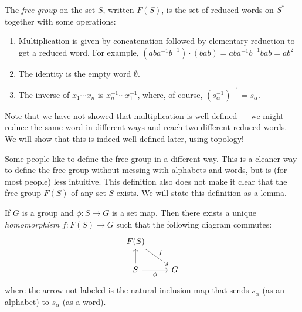 \documentclass[a4paper]{article}
\begin{document}
\begin{defi}
  The \emph{free group} on the set $S$, written $F(S)$, is the set of reduced words on $S^*$ together with some operations:
  \begin{enumerate}
    \item Multiplication is given by concatenation followed by elementary reduction to get a reduced word. For example, $(aba^{-1}b^{-1}) \cdot (bab) = aba^{-1}b^{-1}bab = ab^2$
    \item The identity is the empty word $\emptyset$.
    \item The inverse of $x_1\cdots x_n$ is $x_n^{-1}\cdots x_1^{-1}$, where, of course, $(s_\alpha^{-1})^{-1} = s_\alpha$.
  \end{enumerate}
\end{defi}
Note that we have not showed that multiplication is well-defined --- we might reduce the same word in different ways and reach two different reduced words. We will show that this is indeed well-defined later, using topology!

Some people like to define the free group in a different way. This is a cleaner way to define the free group without messing with alphabets and words, but is (for most people) less intuitive. This definition also does not make it clear that the free group $F(S)$ of any set $S$ exists. We will state this definition as a lemma.
\begin{lemma}
  If $G$ is a group and $\phi: S\to G$ is a set map. Then there exists a unique \emph{homomorphism} $f: F(S) \to G$ such that the following diagram commutes:
  \[
    \begin{tikzcd}
      F(S) \ar[dr, dashed, "f"] \\
      S \ar[u] \ar[r, "\phi"'] & G
    \end{tikzcd}
  \]
  where the arrow not labeled is the natural inclusion map that sends $s_\alpha$ (as an alphabet) to $s_\alpha$ (as a word).
\end{lemma}
\end{document}
